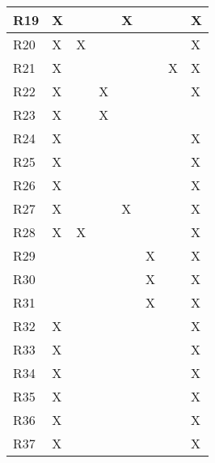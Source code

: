 \begin{table}[]
\begin{tabular}{|l|l|l|l|l|l|l|l|}
    R19 & X  &    &    & X  &     &    & X    \\ \hline
    R20 & X  & X  &    &    &     &    & X    \\ \hline
    R21 & X  &    &    &    &     & X  & X    \\ \hline
    R22 & X  &    & X  &    &     &    & X    \\ \hline
    R23 & X  &    & X  &    &     &    &      \\ \hline
    R24 & X  &    &    &    &     &    & X    \\ \hline
    R25 & X  &    &    &    &     &    & X    \\ \hline
    R26 & X  &    &    &    &     &    & X    \\ \hline
    R27 & X  &    &    & X  &     &    & X    \\ \hline
    R28 & X  & X  &    &    &     &    & X    \\ \hline
    R29 &    &    &    &    & X   &    & X    \\ \hline
    R30 &    &    &    &    & X   &    & X    \\ \hline
    R31 &    &    &    &    & X   &    & X    \\ \hline
    R32 & X  &    &    &    &     &    & X    \\ \hline
    R33 & X  &    &    &    &     &    & X    \\ \hline
    R34 & X  &    &    &    &     &    & X    \\ \hline
    R35 & X  &    &    &    &     &    & X    \\ \hline
    R36 & X  &    &    &    &     &    & X    \\ \hline
    R37 & X  &    &    &    &     &    & X    \\ \hline
    \end{tabular}
    \end{table}